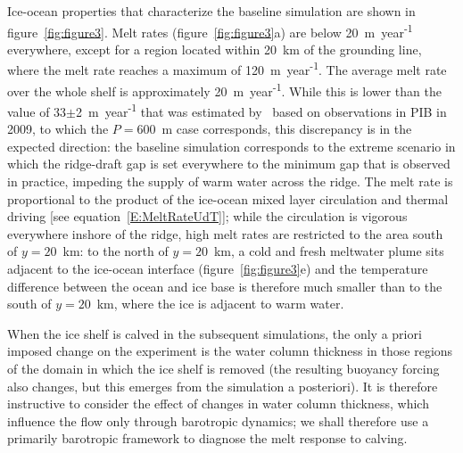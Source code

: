 \documentclass[draft]{agujournal2019}
\begin{document}
Ice-ocean properties that characterize the baseline simulation are shown in figure~\ref{fig:figure3}. Melt rates (figure~\ref{fig:figure3}a) are below  20~m~year\textsuperscript{-1} everywhere, except for a region located within 20~km of the grounding line, where the melt rate reaches a maximum of 120~m~year\textsuperscript{-1}. The average melt rate over the whole shelf is approximately 20~m~year\textsuperscript{-1}.  While this is lower than the value of 33$\pm$2~m~year\textsuperscript{-1} that was estimated by~ based on observations in PIB in 2009, to which the $P=600$~m case corresponds, this discrepancy is in the expected direction: the baseline simulation corresponds to the extreme scenario in which the ridge-draft gap is set everywhere to the minimum gap that is observed in practice, impeding the supply of warm water across the ridge. The melt rate is proportional to the product of the ice-ocean mixed layer circulation and thermal driving [see equation~\eqref{E:MeltRateUdT}]; while the circulation is vigorous everywhere inshore of the ridge, high melt rates are restricted to the area south of $y=20$~km: to the north of $y=20$~km, a cold and fresh meltwater plume sits adjacent to the ice-ocean interface (figure~\ref{fig:figure3}e) and the temperature difference between the ocean and ice base is therefore much smaller than to the south of $y=20$~km, where the ice is adjacent to warm water.


When the ice shelf is calved in the subsequent simulations, the only a priori imposed change on the experiment is the water column thickness in those regions of the domain in which the ice shelf is removed (the resulting buoyancy forcing also changes, but this emerges from the simulation a posteriori). It is therefore instructive to consider the effect of changes in water column thickness, which influence the flow only through barotropic dynamics; we shall therefore use a primarily barotropic framework to diagnose the melt response to calving. 
\end{document}
